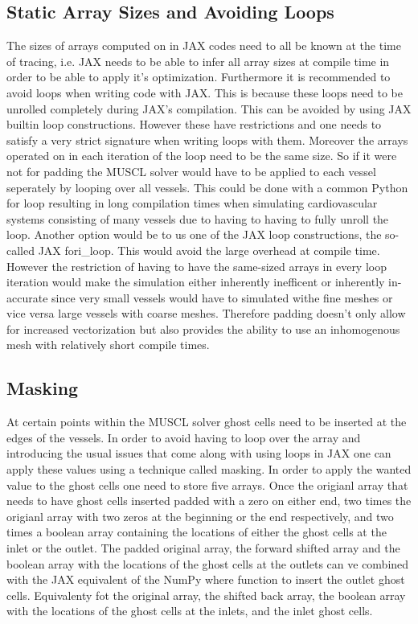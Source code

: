 \documentclass[a4paper, oneside]{discothesis}
\begin{document}
\subsection{Static Array Sizes and Avoiding Loops} \label{ssec:al}
The sizes of arrays computed on in JAX codes need to all be known at the time of tracing, i.e. JAX needs to be able to infer all array sizes at compile time in order to be able to apply it's optimization.
Furthermore it is recommended to avoid loops when writing code with JAX.
This is because these loops need to be unrolled completely during JAX's compilation.
This can be avoided by using JAX builtin loop constructions.
However these have restrictions and one needs to satisfy a very strict signature when writing loops with them.
Moreover the arrays operated on in each iteration of the loop need to be the same size.
So if it were not for padding the MUSCL solver would have to be applied to each vessel seperately by looping over all vessels.
This could be done with a common Python for loop resulting in long compilation times when simulating cardiovascular systems consisting of many vessels due to having to having to fully unroll the loop.
Another option would be to us one of the JAX loop constructions, the so-called JAX fori\_loop.
This would avoid the large overhead at compile time.
However the restriction of having to have the same-sized arrays in every loop iteration would make the simulation either inherently inefficent or inherently in-accurate since very small vessels would have to simulated withe fine meshes or vice versa large vessels with coarse meshes.
Therefore padding doesn't only allow for increased vectorization but also provides the ability to use an inhomogenous mesh with relatively short compile times.

\subsection{Masking}
At certain points within the MUSCL solver ghost cells need to be inserted at the edges of the vessels.
In order to avoid having to loop over the array and introducing the usual issues that come along with using loops in JAX one can apply these values using a technique called masking.
In order to apply the wanted value to the ghost cells one need to store five arrays.
Once the origianl array that needs to have ghost cells inserted padded with a zero on either end, two times the origianl array with two zeros at the beginning or the end respectively, and two times a boolean array containing the locations of either the ghost cells at the inlet or the outlet.
The padded original array, the forward shifted array and the boolean array with the locations of the ghost cells at the outlets can ve combined with the JAX equivalent of the NumPy where function to insert the outlet ghost cells.
Equivalenty fot the original array, the shifted back array, the boolean array with the locations of the ghost cells at the inlets, and the inlet ghost cells.
\end{document}
